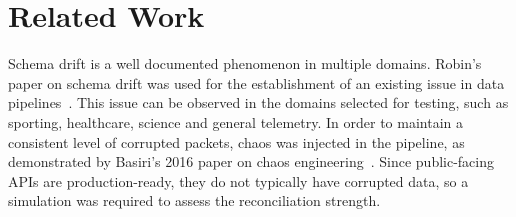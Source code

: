 \documentclass[journal]{IEEEtran}
\begin{document}

\section{Related Work}

Schema drift is a well documented phenomenon in multiple domains. Robin's paper on schema drift was used for the establishment of an existing issue in data pipelines~\cite{Robindrift}. This issue can be observed in the domains selected for testing, such as sporting, healthcare, science and general telemetry. In order to maintain a consistent level of corrupted packets, chaos was injected in the pipeline, as demonstrated by Basiri's 2016 paper on chaos engineering~\cite{Basiri_2016}. Since public-facing APIs are production-ready, they do not typically have corrupted data, so a simulation was required to assess the reconciliation strength.
\end{document}

